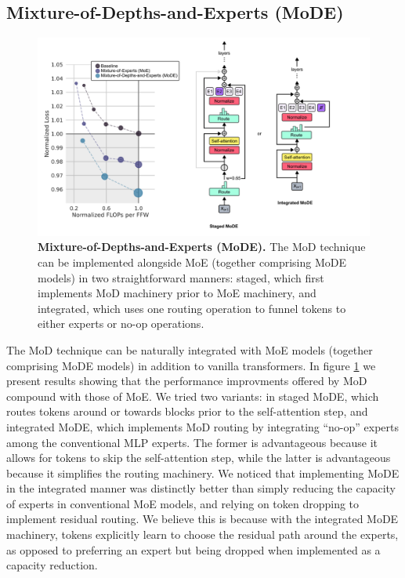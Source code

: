 \documentclass[11pt, a4paper, onecolumn, logo, copyright]{googledeepmind}
\begin{document}
\subsection{Mixture-of-Depths-and-Experts (MoDE)}
\begin{figure}[h]
    \centering
    \includegraphics[width=\textwidth]{mode.png}
    \caption{\textbf{Mixture-of-Depths-and-Experts (MoDE).} The MoD technique can be implemented alongside MoE (together comprising MoDE models) in two straightforward manners: staged, which first implements MoD machinery prior to MoE machinery, and integrated, which uses one routing operation to funnel tokens to either experts or no-op operations.}
    \label{fig:mode}
\end{figure}
The MoD technique can be naturally integrated with MoE models (together comprising MoDE models) in addition to vanilla transformers. In figure \ref{fig:mode} we present results showing that the performance improvments offered by MoD compound with those of MoE. We tried two variants: in staged MoDE, which routes tokens around or towards blocks prior to the self-attention step, and integrated MoDE, which implements MoD routing by integrating ``no-op'' experts among the conventional MLP experts. The former is advantageous because it allows for tokens to skip the self-attention step, while the latter is advantageous because it simplifies the routing machinery. We noticed that implementing MoDE in the integrated manner was distinctly better than simply reducing the capacity of experts in conventional MoE models, and relying on token dropping to implement residual routing. We believe this is because with the integrated MoDE machinery, tokens explicitly learn to choose the residual path around the experts, as opposed to preferring an expert but being dropped when implemented as a capacity reduction. 
\end{document}
